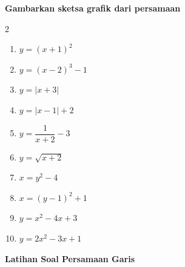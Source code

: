 \documentclass[12pt]{article}
\begin{document}
\vspace{0.5cm}
\noindent \Large \textbf{Gambarkan sketsa grafik dari persamaan}
\normalsize
\begin{multicols}{2}
    \begin{enumerate}
        \item $y=(x+1)^2$
        \item $y=(x-2)^3-1$
        \item $y=|x+3|$
        \item $y=|x-1|+2$
        \item $y=\dfrac{1}{x+2}-3$
        \item $y=\sqrt{x+2}$
        \item $x=y^2-4$
        \item $x=(y-1)^2+1$
        \item $y=x^2-4x+3$
        \item $y=2x^2-3x+1$
    \end{enumerate}
    
\end{multicols}
\vspace{0.5cm}
\noindent \Large \textbf{Latihan Soal Persamaan Garis}
\normalsize
\end{document}
